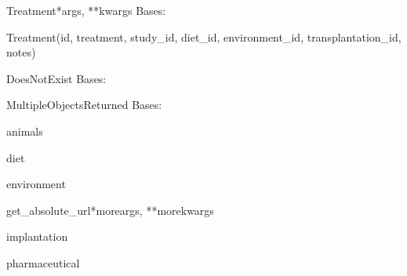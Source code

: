 \documentclass[letterpaper,10pt,english]{sphinxmanual}
\begin{document}
\hypertarget{data.models.Treatment}{}\begin{classdesc}{Treatment}{*args, **kwargs}
Bases: 

Treatment(id, treatment, study\_id, diet\_id, environment\_id, transplantation\_id, notes)

\hypertarget{data.models.Treatment.DoesNotExist}{}\begin{excdesc}{DoesNotExist}
Bases: 
\end{excdesc}

\hypertarget{data.models.Treatment.MultipleObjectsReturned}{}\begin{excdesc}{MultipleObjectsReturned}
Bases: 
\end{excdesc}

\hypertarget{data.models.Treatment.animals}{}\begin{memberdesc}[Treatment]{animals}\end{memberdesc}

\hypertarget{data.models.Treatment.diet}{}\begin{memberdesc}[Treatment]{diet}\end{memberdesc}

\hypertarget{data.models.Treatment.environment}{}\begin{memberdesc}[Treatment]{environment}\end{memberdesc}

\hypertarget{data.models.Treatment.get\_absolute\_url}{}\begin{methoddesc}[Treatment]{get\_absolute\_url}{*moreargs, **morekwargs}\end{methoddesc}

\hypertarget{data.models.Treatment.implantation}{}\begin{memberdesc}[Treatment]{implantation}\end{memberdesc}

\hypertarget{data.models.Treatment.pharmaceutical}{}\begin{memberdesc}[Treatment]{pharmaceutical}\end{memberdesc}


\end{classdesc}
\end{document}
